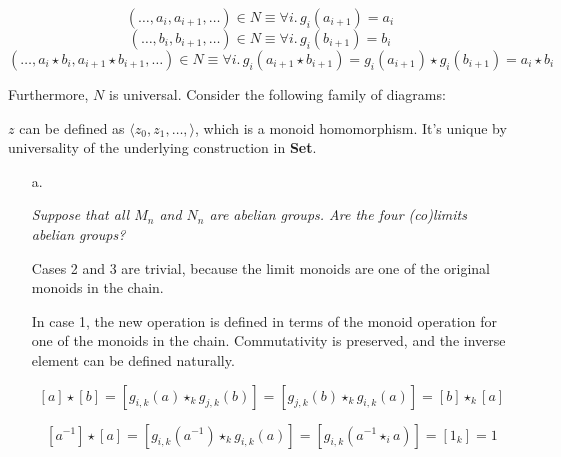 \documentclass[a4paper,notitlepage]{article}
\begin{document}
\begin{enumerate}
\begin{enumerate}
         $$(…, a_i, a_{i+1}, …) \in N \equiv \forall i .\, g_i(a_{i+1}) = a_i $$
         $$(…, b_i, b_{i+1}, …) \in N \equiv \forall i .\, g_i(b_{i+1}) = b_i $$
         $$(…, a_i \star b_i, a_{i+1} \star b_{i+1}, …) \in N \equiv \forall i.\, g_i(a_{i+1} \star b_{i+1}) = g_i(a_{i+1}) \star g_i(b_{i+1}) = a_i \star b_i$$


         Furthermore, $N$ is universal. Consider the following family of diagrams:

         

         $z$ can be defined as $\langle z_0, z_1, …, \rangle$, which is
         a monoid homomorphism. It's unique by universality of the
         underlying construction in {\bf Set}.

     \end{enumerate}
     

     \begin{enumerate}

       \item[a.]

         {\em Suppose that all $M_n$ and $N_n$ are abelian groups.
           Are the four (co)limits abelian groups? }

         Cases 2 and 3 are trivial, because the limit monoids are
         one of the original monoids in the chain.

         In case 1, the new operation is defined in terms of the monoid
         operation for one of the monoids in the chain. Commutativity is
         preserved, and the inverse element can be defined naturally.

         $$[a] \star [b] = \left [ g_{i,k}(a) \star_k g_{j,k}(b) \right ] = \left [ g_{j,k}(b) \star_k g_{i,k}(a) \right ] = [b] \star_k [a]$$
         
         $$[a^{-1}] \star [a] = \left [ g_{i,k}(a^{-1}) \star_k g_{i,k}(a) \right ] = \left [ g_{i,k}(a^{-1} \star_i a) \right ] = [1_k] = 1$$
         

\end{enumerate}
\end{enumerate}
\end{document}
